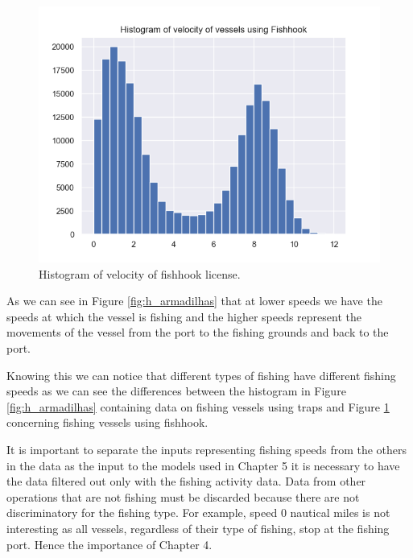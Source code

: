 \begin{figure}[h]
    \centering
    \includegraphics[width=0.8\linewidth]{Chapters/img/h_linha.png}
    \caption{Histogram of velocity of fishhook license.}
    \label{fig:h_linha}
\end{figure}

As we can see in Figure \ref{fig:h_armadilhas} that at lower speeds we have the speeds at which the vessel is fishing and the higher speeds represent the movements of the vessel from the port to the fishing grounds and back to the port.





Knowing this we can notice that different types of fishing have different fishing speeds as we can see the differences between the histogram in Figure \ref{fig:h_armadilhas} containing data on fishing vessels using traps and Figure \ref{fig:h_linha} concerning fishing vessels using fishhook.





It is important to separate the inputs representing fishing speeds from the others in the data as the input to the models used in Chapter 5 it is necessary to have the data filtered out only with the fishing activity data.
Data from other operations that are not fishing must be discarded because there are not discriminatory for the fishing type. For example, speed 0 nautical miles is not interesting as all vessels, regardless of their type of fishing, stop at the fishing port.
Hence the importance of Chapter 4.






